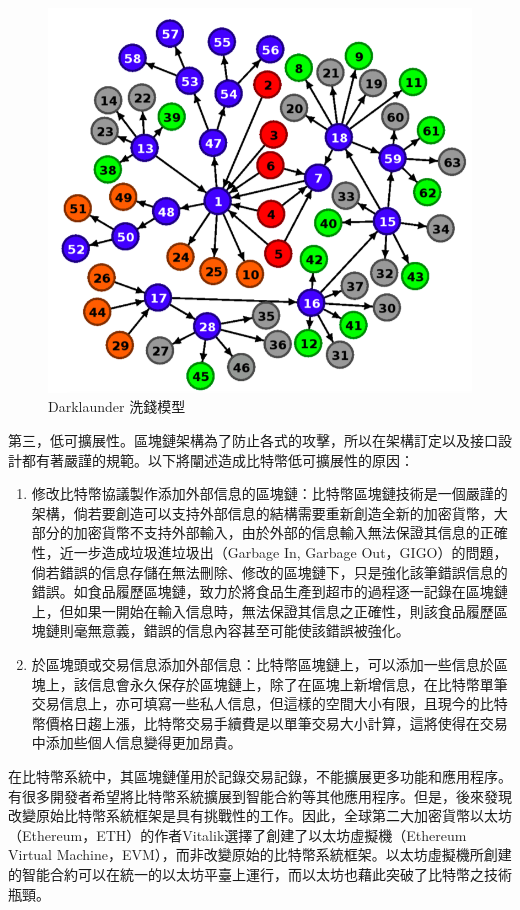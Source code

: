 					\begin{figure}[!htbp]
						\centering
						\includegraphics[width = .6\textwidth]{Darklaunderworkflow.png}
						\caption{Darklaunder 洗錢模型\supercite{AnAnalysisofBitcoinLaundryServices}}\label{Darklaunderworkflow}
					\end{figure}

				第三，低可擴展性。區塊鏈架構為了防止各式的攻擊，所以在架構訂定以及接口設計都有著嚴謹的規範。以下將闡述造成比特幣低可擴展性的原因：

					\begin{enumerate}

						\item 修改比特幣協議製作添加外部信息的區塊鏈：比特幣區塊鏈技術是一個嚴謹的架構，倘若要創造可以支持外部信息的結構需要重新創造全新的加密貨幣，大部分的加密貨幣不支持外部輸入，由於外部的信息輸⼊無法保證其信息的正確性，近一步造成垃圾進垃圾出（Garbage In, Garbage Out，GIGO）的問題，倘若錯誤的信息存儲在無法刪除、修改的區塊鏈下，只是強化該筆錯誤信息的錯誤。如食品履歷區塊鏈，致力於將食品生產到超市的過程逐一記錄在區塊鏈上，但如果一開始在輸入信息時，無法保證其信息之正確性，則該食品履歷區塊鏈則毫無意義，錯誤的信息內容甚至可能使該錯誤被強化。

						\item 於區塊頭或交易信息添加外部信息：比特幣區塊鏈上，可以添加一些信息於區塊上，該信息會永久保存於區塊鏈上，除了在區塊上新增信息，在比特幣單筆交易信息上，亦可填寫一些私人信息，但這樣的空間大小有限，且現今的比特幣價格日趨上漲，比特幣交易手續費是以單筆交易大小計算，這將使得在交易中添加些個人信息變得更加昂貴。

					\end{enumerate}

				在比特幣系統中，其區塊鏈僅用於記錄交易記錄，不能擴展更多功能和應用程序。有很多開發者希望將比特幣系統擴展到智能合約等其他應用程序。但是，後來發現改變原始比特幣系統框架是具有挑戰性的工作。因此，全球第二大加密貨幣以太坊（Ethereum，ETH）的作者Vitalik選擇了創建了以太坊虛擬機（Ethereum Virtual Machine，EVM），而非改變原始的比特幣系統框架。以太坊虛擬機所創建的智能合約可以在統一的以太坊平臺上運行，而以太坊也藉此突破了比特幣之技術瓶頸。
	
